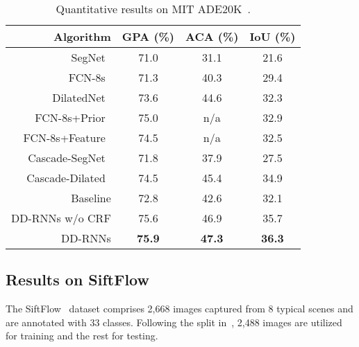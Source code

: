 \documentclass[10pt,twocolumn,letterpaper]{article}
\begin{document}
\renewcommand\arraystretch{1}
\begin{table}[htbp]\small
  \centering
  \caption{Quantitative results on MIT ADE20K~\cite{zhou2017scene}.}
    \begin{tabular}{r|ccc}
    \hline
    Algorithm & GPA (\%) & ACA (\%) & IoU (\%) \\
    \hline
    \hline
    SegNet~\cite{badrinarayanan2015segnet}  & 71.0    & 31.1    & 21.6 \\
    FCN-8s~\cite{long2015fully}  & 71.3    & 40.3    & 29.4 \\
    DilatedNet~\cite{yu2015multi} & 73.6    & 44.6    & 32.3 \\
    FCN-8s+Prior~\cite{hung2017scene} & 75.0    & n/a     & 32.9 \\
    FCN-8s+Feature~\cite{hung2017scene} & 74.5    & n/a     & 32.5 \\
    Cascade-SegNet~\cite{zhou2017scene} & 71.8    & 37.9    & 27.5 \\
    Cascade-Dilated~\cite{zhou2017scene} & 74.5    & 45.4    & 34.9 \\
    \hline
    \hline
    Baseline & 72.8    & 42.6    & 32.1 \\
    DD-RNNs w/o CRF   & 75.6    &  46.9    &  35.7 \\
    DD-RNNs    & {\bf 75.9}    & {\bf 47.3}    & {\bf 36.3} \\
    \hline
    \end{tabular}%
  \label{tab:tab2}%
\end{table}%

\subsection{Results on SiftFlow}

The SiftFlow~\cite{liu2011sift} dataset comprises 2,668 images captured from 8 typical scenes and are annotated with 33 classes. Following the split in~\cite{liu2011sift}, 2,488 images are utilized for training and the rest for testing.
\end{document}
